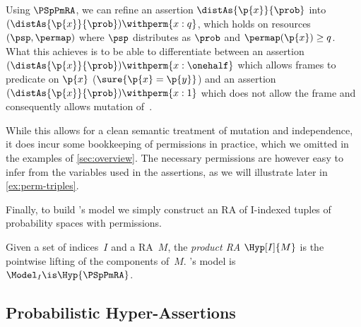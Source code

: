 \begin{example}
\label{ex:perm-ra}
  Using $\PSpPmRA$,
  we can refine an assertion
  $\distAs{\p{x}}{\prob}$ into
  $(\distAs{\p{x}}{\prob})\withperm{x:q}$,
  which holds on resources $(\psp, \permap)$ where $\psp$ distributes 
  as $\prob$ and $\permap(\p{x})\geq q$.
  What this achieves is to be able to differentiate between an assertion
  $(\distAs{\p{x}}{\prob})\withperm{x:\onehalf}$ which allows frames to predicate on $\p{x}$ (\eg $\sure{\p{x}=\p{y}}$) and
  an assertion $(\distAs{\p{x}}{\prob})\withperm{x:1}$ which does not allow the
  frame and consequently allows mutation of~.
\end{example}

While this allows for a clean semantic treatment of mutation and independence,
it does incur some bookkeeping of permissions in practice,
which we omitted in the examples of \cref{sec:overview}.
The necessary permissions are however easy to infer
from the variables used in the assertions,
as we will illustrate later in \cref{ex:perm-triples}.

Finally, to build \thelogic's model we simply construct an RA
of \pre I-indexed tuples of probability spaces with permissions.

\begin{definition}[\thelogic\ RA]
Given a set of indices~$I$ and a RA~$M$,
  the \emph{product RA} $ \Hyp[I]{M} $ is the pointwise lifting
  of the components of~$M$.
\thelogic's model is $\Model_I \is \Hyp{\PSpPmRA}$.
\end{definition}

\subsection{Probabilistic Hyper-Assertions}
\label{sec:prob-assert}

